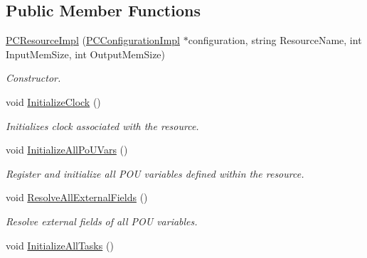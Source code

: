 \subsection*{Public Member Functions}
\begin{DoxyCompactItemize}
\item 
\hyperlink{classpc__emulator_1_1PCResourceImpl_ad8122975b5daf8683d9599176a63b33a}{P\+C\+Resource\+Impl} (\hyperlink{classpc__emulator_1_1PCConfigurationImpl}{P\+C\+Configuration\+Impl} $\ast$configuration, string Resource\+Name, int Input\+Mem\+Size, int Output\+Mem\+Size)
\begin{DoxyCompactList}\small\item\em Constructor. \end{DoxyCompactList}\item 
void \hyperlink{classpc__emulator_1_1PCResourceImpl_a7e2b6e746c7b3cef8c086b1c3dd18b8e}{Initialize\+Clock} ()\hypertarget{classpc__emulator_1_1PCResourceImpl_a7e2b6e746c7b3cef8c086b1c3dd18b8e}{}\label{classpc__emulator_1_1PCResourceImpl_a7e2b6e746c7b3cef8c086b1c3dd18b8e}

\begin{DoxyCompactList}\small\item\em Initializes clock associated with the resource. \end{DoxyCompactList}\item 
void \hyperlink{classpc__emulator_1_1PCResourceImpl_ac3074be3fc6d79651d7921128c86aedb}{Initialize\+All\+Po\+U\+Vars} ()\hypertarget{classpc__emulator_1_1PCResourceImpl_ac3074be3fc6d79651d7921128c86aedb}{}\label{classpc__emulator_1_1PCResourceImpl_ac3074be3fc6d79651d7921128c86aedb}

\begin{DoxyCompactList}\small\item\em Register and initialize all P\+OU variables defined within the resource. \end{DoxyCompactList}\item 
void \hyperlink{classpc__emulator_1_1PCResourceImpl_a1da54f6b883793da02f8b8d4ff980c45}{Resolve\+All\+External\+Fields} ()\hypertarget{classpc__emulator_1_1PCResourceImpl_a1da54f6b883793da02f8b8d4ff980c45}{}\label{classpc__emulator_1_1PCResourceImpl_a1da54f6b883793da02f8b8d4ff980c45}

\begin{DoxyCompactList}\small\item\em Resolve external fields of all P\+OU variables. \end{DoxyCompactList}\item 
void \hyperlink{classpc__emulator_1_1PCResourceImpl_a3aed602da7046e03d005b72e5cf214bd}{Initialize\+All\+Tasks} ()\hypertarget{classpc__emulator_1_1PCResourceImpl_a3aed602da7046e03d005b72e5cf214bd}{}\label{classpc__emulator_1_1PCResourceImpl_a3aed602da7046e03d005b72e5cf214bd}


\end{DoxyCompactItemize}
